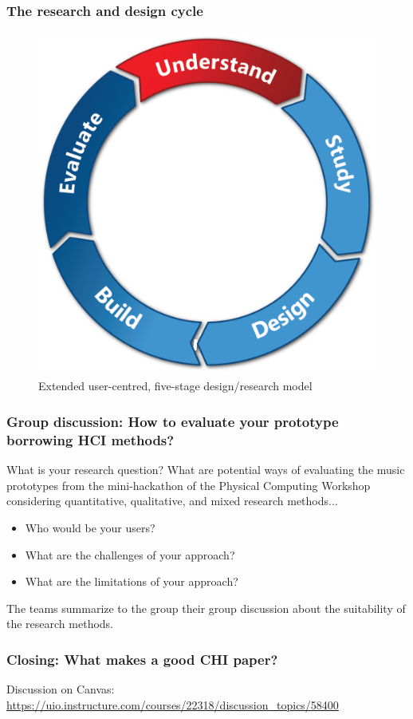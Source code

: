 \documentclass[screen, aspectratio=169]{beamer}
\begin{document}
\begin{frame}
\frametitle{The research and design cycle}
\begin{figure}
\includegraphics[scale=0.15]{img/design-cycle.pdf}
\caption{Extended user-centred, five-stage design/research model \cite{Harper.et.al.2008.being}}
\end{figure}
\end{frame}
%
\begin{frame}
\frametitle{Group discussion: How to evaluate your prototype borrowing HCI methods?}
What is your research question? What are potential ways of evaluating the music prototypes from the mini-hackathon of the Physical Computing Workshop considering quantitative, qualitative, and mixed research methods...
\begin{itemize}
\item Who would be your users? 
\item What are the challenges of your approach? 
\item What are the limitations of your approach? 
\end{itemize}
The teams summarize to the group their group discussion about the suitability of the research methods.
\end{frame}
%
\begin{frame}
\frametitle{Closing: What makes a good CHI paper?}
Discussion on Canvas: \url{https://uio.instructure.com/courses/22318/discussion_topics/58400}
\end{frame}
\end{document}
